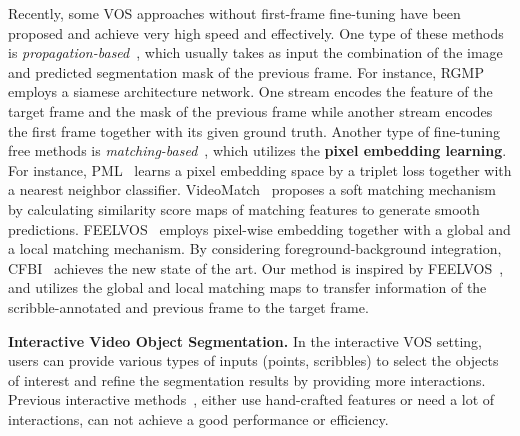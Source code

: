 \documentclass[10pt,twocolumn,letterpaper]{article}
\begin{document}
Recently, some VOS approaches without first-frame fine-tuning have been proposed and achieve very high speed and effectively. One type of these methods is \emph{propagation-based}~\cite{wug2018fast,yang2018efficient,bao2018cnn}, which usually takes as input the combination of the image and predicted segmentation mask of the previous frame.  For instance, RGMP~\cite{wug2018fast} employs a siamese architecture network. One stream encodes the feature of the target frame and the mask of the previous frame while another stream encodes the first frame together with its given ground truth. 
Another type of fine-tuning free methods is \emph{matching-based}~\cite{chen2018blazingly,hu2018videomatch,voigtlaender2019feelvos,wang2019ranet}, which utilizes the \textbf{pixel embedding learning}. For instance, PML~\cite{chen2018blazingly} learns a pixel embedding space by a triplet loss together with a nearest neighbor classifier. VideoMatch~\cite{hu2018videomatch} proposes a soft matching mechanism by calculating similarity score maps of matching features to generate smooth predictions. FEELVOS~\cite{voigtlaender2019feelvos} employs pixel-wise embedding together with a global and a local matching mechanism. By considering foreground-background integration, CFBI~\cite{yang2020collaborative} achieves the new state of the art.
Our method is inspired by FEELVOS~\cite{voigtlaender2019feelvos}, and utilizes the global and local matching maps to transfer information of the scribble-annotated and previous frame to the target frame. 




\noindent\textbf{Interactive Video Object Segmentation.}
In the interactive VOS setting, users can provide various types of inputs (\eg points, scribbles) to select the objects of interest and refine the segmentation results by providing more interactions. 
Previous interactive methods~\cite{wang2005interactive,price2009livecut,bai2009video}, either use hand-crafted features or need a lot of interactions, can not achieve a good performance or efficiency.
\end{document}
